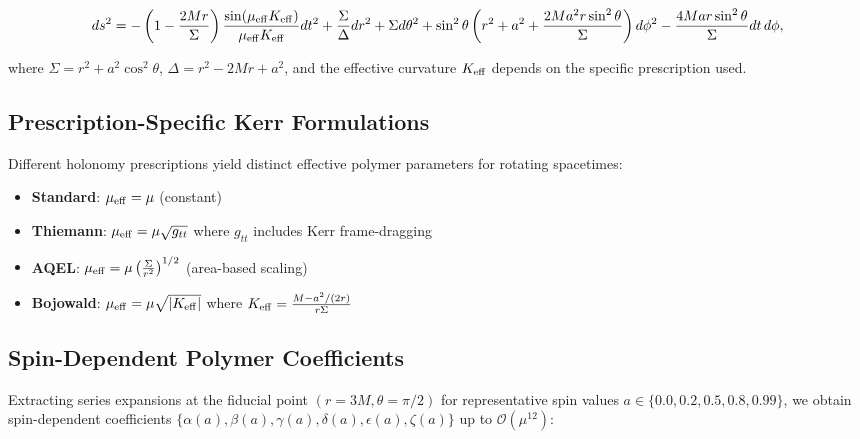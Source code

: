 \documentclass[11pt]{article}
\begin{document}
\begin{equation}
ds^2 = -\left(1 - \frac{2Mr}{\Sigma}\right) \frac{\sin(\mu_{\rm eff} K_{\rm eff})}{\mu_{\rm eff} K_{\rm eff}} dt^2 + \frac{\Sigma}{\Delta} dr^2 + \Sigma d\theta^2 + \sin^2\theta \left(r^2 + a^2 + \frac{2Ma^2r\sin^2\theta}{\Sigma}\right) d\phi^2 - \frac{4Mar\sin^2\theta}{\Sigma} dt\,d\phi,
\end{equation}

where $\Sigma = r^2 + a^2\cos^2\theta$, $\Delta = r^2 - 2Mr + a^2$, and the effective curvature $K_{\rm eff}$ depends on the specific prescription used.

\subsection{Prescription-Specific Kerr Formulations}

Different holonomy prescriptions yield distinct effective polymer parameters for rotating spacetimes:

\begin{itemize}
\item \textbf{Standard}: $\mu_{\rm eff} = \mu$ (constant)
\item \textbf{Thiemann}: $\mu_{\rm eff} = \mu \sqrt{g_{tt}}$ where $g_{tt}$ includes Kerr frame-dragging
\item \textbf{AQEL}: $\mu_{\rm eff} = \mu \left(\frac{\Sigma}{r^2}\right)^{1/2}$ (area-based scaling)
\item \textbf{Bojowald}: $\mu_{\rm eff} = \mu \sqrt{|K_{\rm eff}|}$ where $K_{\rm eff} = \frac{M - a^2/(2r)}{r\Sigma}$
\end{itemize}

\subsection{Spin-Dependent Polymer Coefficients}

Extracting series expansions at the fiducial point $(r=3M, \theta=\pi/2)$ for representative spin values $a \in \{0.0, 0.2, 0.5, 0.8, 0.99\}$, we obtain spin-dependent coefficients $\{\alpha(a), \beta(a), \gamma(a), \delta(a), \epsilon(a), \zeta(a)\}$ up to $\mathcal{O}(\mu^{12})$:
\end{document}

